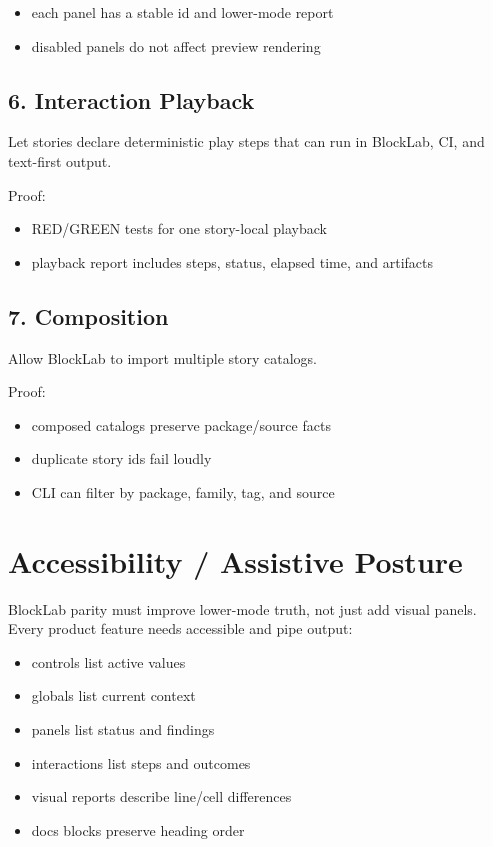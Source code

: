 \begin{itemize}
\tightlist
\item
  each panel has a stable id and lower-mode report
\item
  disabled panels do not affect preview rendering
\end{itemize}

\subsection{6. Interaction Playback}\label{record-135-interaction-playback}

Let stories declare deterministic play steps that can run in BlockLab, CI, and text-first output.

Proof:

\begin{itemize}
\tightlist
\item
  RED/GREEN tests for one story-local playback
\item
  playback report includes steps, status, elapsed time, and artifacts
\end{itemize}

\subsection{7. Composition}\label{record-135-composition}

Allow BlockLab to import multiple story catalogs.

Proof:

\begin{itemize}
\tightlist
\item
  composed catalogs preserve package/source facts
\item
  duplicate story ids fail loudly
\item
  CLI can filter by package, family, tag, and source
\end{itemize}

\section{Accessibility / Assistive Posture}\label{record-135-accessibility-assistive-posture}

BlockLab parity must improve lower-mode truth, not just add visual panels. Every product feature needs accessible and pipe output:

\begin{itemize}
\tightlist
\item
  controls list active values
\item
  globals list current context
\item
  panels list status and findings
\item
  interactions list steps and outcomes
\item
  visual reports describe line/cell differences
\item
  docs blocks preserve heading order
\end{itemize}

